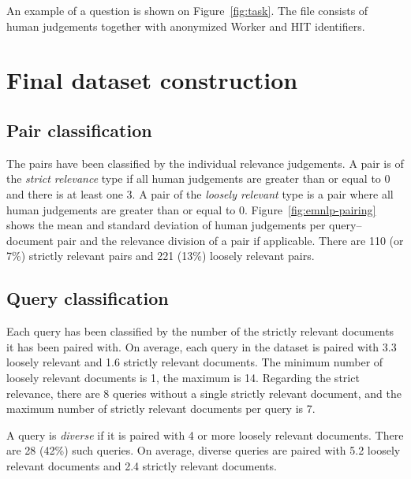 An example of a question is shown on Figure~\ref{fig:task}. The  file consists of human judgements together with anonymized Worker and HIT identifiers.



\section{Final dataset construction}
\label{sec:postprocessing}

\subsection{Pair classification}

The pairs have been classified by the individual relevance judgements. A pair is of the \textit{strict relevance} type if all human judgements are greater than or equal to 0 and there is at least one 3. A pair of the \textit{loosely   relevant} type is a pair where all human judgements are greater than or equal to 0. Figure~\ref{fig:emnlp-pairing} shows the mean and standard deviation of human judgements per query--document pair and the relevance division of a pair if applicable. There are 110 (or 7\%) strictly relevant pairs and 221 (13\%) loosely relevant pairs.

\subsection{Query classification}

Each query has been classified by the number of the strictly relevant documents it has been paired with. On average, each query in the dataset is paired with 3.3 loosely relevant and 1.6 strictly relevant documents. The minimum number of loosely relevant documents is 1, the maximum is 14. Regarding the strict relevance, there are 8 queries without a single strictly relevant document, and the maximum number of strictly relevant documents per query is 7.

A query is \textit{diverse} if it is paired with 4 or more loosely relevant documents. There are 28 (42\%) such queries. On average, diverse queries are paired with 5.2 loosely relevant documents and 2.4 strictly relevant documents.

